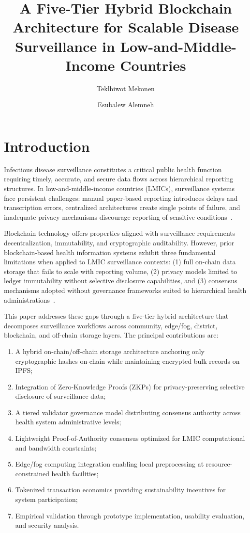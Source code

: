 \documentclass[AMA,LATO1COL]{WileyNJDv5}
\title{A Five-Tier Hybrid Blockchain Architecture for Scalable Disease Surveillance in Low-and-Middle-Income Countries}
\author[1]{Teklhiwot Mekonen}
\author[1]{Esubalew Alemneh}
\affil[1]{Faculty of Computing, Bahir Dar Institute of Technology, Bahir Dar University, Bahir Dar, Ethiopia}
\begin{document}
\maketitle

\section{Introduction}\label{sec:introduction}

Infectious disease surveillance constitutes a critical public health function requiring timely, accurate, and secure data flows across hierarchical reporting structures. In low-and-middle-income countries (LMICs), surveillance systems face persistent challenges: manual paper-based reporting introduces delays and transcription errors, centralized architectures create single points of failure, and inadequate privacy mechanisms discourage reporting of sensitive conditions~\cite{WHO2021,Olu-Abiodun2025}.

Blockchain technology offers properties aligned with surveillance requirements---decentralization, immutability, and cryptographic auditability. However, prior blockchain-based health information systems exhibit three fundamental limitations when applied to LMIC surveillance contexts: (1) full on-chain data storage that fails to scale with reporting volume, (2) privacy models limited to ledger immutability without selective disclosure capabilities, and (3) consensus mechanisms adopted without governance frameworks suited to hierarchical health administrations~\cite{Li2025,Abdul2024}.

This paper addresses these gaps through a five-tier hybrid architecture that decomposes surveillance workflows across community, edge/fog, district, blockchain, and off-chain storage layers. The principal contributions are:

\begin{enumerate}
    \item A hybrid on-chain/off-chain storage architecture anchoring only cryptographic hashes on-chain while maintaining encrypted bulk records on IPFS;
    \item Integration of Zero-Knowledge Proofs (ZKPs) for privacy-preserving selective disclosure of surveillance data;
    \item A tiered validator governance model distributing consensus authority across health system administrative levels;
    \item Lightweight Proof-of-Authority consensus optimized for LMIC computational and bandwidth constraints;
    \item Edge/fog computing integration enabling local preprocessing at resource-constrained health facilities;
    \item Tokenized transaction economics providing sustainability incentives for system participation;
    \item Empirical validation through prototype implementation, usability evaluation, and security analysis.
\end{enumerate}
\end{document}
